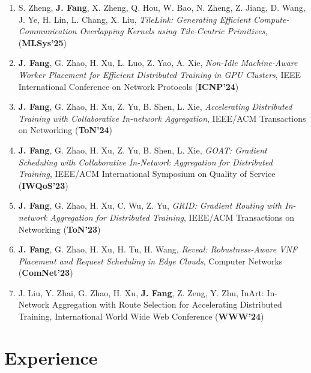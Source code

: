 \documentclass{resume}
\begin{document}
\begin{enumerate}

  \item S. Zheng, \textbf{J. Fang}, X. Zheng, Q. Hou, W. Bao, N. Zheng, Z. Jiang, D. Wang, J. Ye, H. Lin, L. Chang, X. Liu, \textit{TileLink: Generating Efficient Compute-Communication Overlapping Kernels using Tile-Centric Primitives}, (\textbf{MLSys'25})
  \item \textbf{J. Fang}, G. Zhao, H. Xu, L. Luo, Z. Yao, A. Xie, \textit{Non-Idle Machine-Aware Worker Placement for Efficient Distributed Training in GPU Clusters}, IEEE International Conference on Network Protocols (\textbf{ICNP'24})
  \item \textbf{J. Fang}, G. Zhao, H. Xu, Z. Yu, B. Shen, L. Xie, \textit{Accelerating Distributed Training with Collaborative In-network Aggregation}, IEEE/ACM Transactions on Networking (\textbf{ToN'24})
  \item \textbf{J. Fang}, G. Zhao, H. Xu, Z. Yu, B. Shen, L. Xie, \textit{GOAT: Gradient Scheduling with Collaborative In-Network Aggregation for Distributed Training}, IEEE/ACM International Symposium on Quality of Service (\textbf{IWQoS'23})
  \item \textbf{J. Fang}, G. Zhao, H. Xu, C. Wu, Z. Yu, \textit{GRID: Gradient Routing with In-network Aggregation for Distributed Training}, IEEE/ACM Transactions on Networking (\textbf{ToN'23})
  \item \textbf{J. Fang}, G. Zhao, H. Xu, H. Tu, H. Wang, \textit{Reveal: Robustness-Aware VNF Placement and Request Scheduling in Edge Clouds}, Computer Networks (\textbf{ComNet'23})
  \item J. Liu, Y. Zhai, G. Zhao, H. Xu, \textbf{J. Fang}, Z. Zeng, Y. Zhu, InArt: In-Network Aggregation with Route
  Selection for Accelerating Distributed Training, International World Wide Web Conference (\textbf{WWW'24})
\end{enumerate}

\section{Experience}
\end{document}
